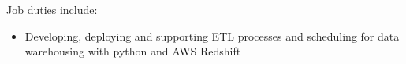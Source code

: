 \normalsize
Job duties include:
\small
\begin{itemize}
    \item Developing, deploying and supporting ETL processes and scheduling for data warehousing with python and AWS Redshift
\end{itemize}
\normalsize
\medskip
